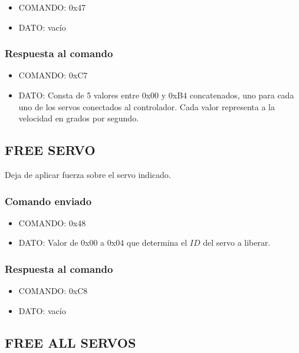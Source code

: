 \documentclass[a4paper,10pt]{article}
\begin{document}
\begin{itemize}
	\item{COMANDO:} 0x47
	\item{DATO:} vac\'io
\end{itemize}

\subsubsection*{Respuesta al comando}

\begin{itemize}
	\item{COMANDO:} 0xC7
	\item{DATO:} Consta de 5 valores entre 0x00 y 0xB4 concatenados, uno para cada uno de los servos conectados al controlador.
	Cada valor representa a la velocidad en grados por segundo.
\end{itemize}

\subsection{FREE SERVO}
\label{free_servo}

Deja de aplicar fuerza sobre el servo indicado.

\subsubsection*{Comando enviado}

\begin{itemize}
	\item{COMANDO:} 0x48
	\item{DATO:} Valor de 0x00 a 0x04 que determina el $ID$ del servo a liberar.
\end{itemize}

\subsubsection*{Respuesta al comando}

\begin{itemize}
	\item{COMANDO:} 0xC8
	\item{DATO:} vac\'io
\end{itemize}

\subsection{FREE ALL SERVOS}
\label{free_all_servos}
\end{document}
